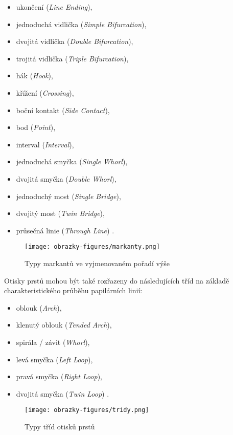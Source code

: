 \begin{itemize}
    \item ukončení (\textit{Line Ending}),
    \item jednoduchá vidlička (\textit{Simple Bifurcation}),
    \item dvojitá vidlička (\textit{Double Bifurcation}),
    \item trojitá vidlička (\textit{Triple Bifurcation}),
    \item hák (\textit{Hook}),
    \item křížení (\textit{Crossing}),
    \item boční kontakt (\textit{Side Contact}),
    \item bod (\textit{Point}),
    \item interval (\textit{Interval}),
    \item jednoduchá smyčka (\textit{Single Whorl}),
    \item dvojitá smyčka (\textit{Double Whorl}),
    \item jednoduchý most (\textit{Single Bridge}),
    \item dvojitý most (\textit{Twin Bridge}),
    \item průsečná linie (\textit{Through Line}) \cite{BIOopora}.\\
\end{itemize}

\begin{figure}[!htbp]
    \centering
    \texttt{[image: obrazky-figures/markanty.png]}
    \caption{Typy markantů ve vyjmenovaném pořadí výše \cite{BIOopora}}
\end{figure}

Otisky prstů mohou být také rozřazeny do následujících tříd na základě charakteristického průběhu papilárních linií:
\begin{itemize}
    \item oblouk (\textit{Arch}),
    \item klenutý oblouk (\textit{Tended Arch}),
    \item spirála / závit (\textit{Whorl}),
    \item levá smyčka (\textit{Left Loop}),
    \item pravá smyčka (\textit{Right Loop}),
    \item dvojitá smyčka (\textit{Twin Loop}) \cite{BIOopora}.
\end{itemize}

\begin{figure}[!htbp]
    \centering
    \texttt{[image: obrazky-figures/tridy.png]}
    \caption{Typy tříd otisků prstů \cite{BIOopora}}
\end{figure}


